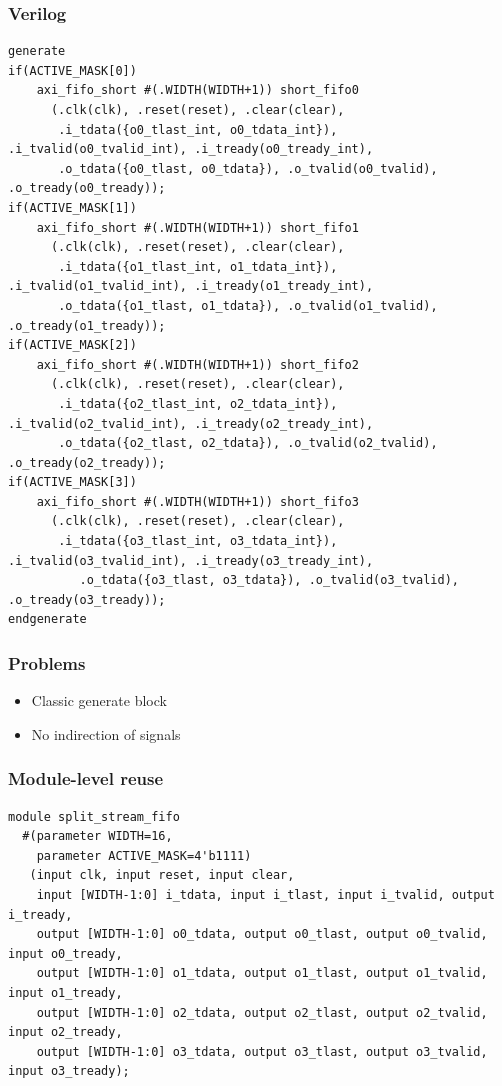 \documentclass{beamer}
\begin{document}
\begin{frame}[fragile]
\frametitle{Verilog}
\tiny
\begin{verbatim}
generate
if(ACTIVE_MASK[0])
	axi_fifo_short #(.WIDTH(WIDTH+1)) short_fifo0
	  (.clk(clk), .reset(reset), .clear(clear),
	   .i_tdata({o0_tlast_int, o0_tdata_int}), .i_tvalid(o0_tvalid_int), .i_tready(o0_tready_int),
	   .o_tdata({o0_tlast, o0_tdata}), .o_tvalid(o0_tvalid), .o_tready(o0_tready));
if(ACTIVE_MASK[1])
	axi_fifo_short #(.WIDTH(WIDTH+1)) short_fifo1
	  (.clk(clk), .reset(reset), .clear(clear),
	   .i_tdata({o1_tlast_int, o1_tdata_int}), .i_tvalid(o1_tvalid_int), .i_tready(o1_tready_int),
	   .o_tdata({o1_tlast, o1_tdata}), .o_tvalid(o1_tvalid), .o_tready(o1_tready));
if(ACTIVE_MASK[2])
	axi_fifo_short #(.WIDTH(WIDTH+1)) short_fifo2
	  (.clk(clk), .reset(reset), .clear(clear),
	   .i_tdata({o2_tlast_int, o2_tdata_int}), .i_tvalid(o2_tvalid_int), .i_tready(o2_tready_int),
	   .o_tdata({o2_tlast, o2_tdata}), .o_tvalid(o2_tvalid), .o_tready(o2_tready));
if(ACTIVE_MASK[3])
	axi_fifo_short #(.WIDTH(WIDTH+1)) short_fifo3
	  (.clk(clk), .reset(reset), .clear(clear),
	   .i_tdata({o3_tlast_int, o3_tdata_int}), .i_tvalid(o3_tvalid_int), .i_tready(o3_tready_int),
	      .o_tdata({o3_tlast, o3_tdata}), .o_tvalid(o3_tvalid), .o_tready(o3_tready));
endgenerate
\end{verbatim}
\end{frame}

\begin{frame}
\frametitle{Problems}
\begin{itemize}
\item Classic generate block
\item No indirection of signals
\end{itemize}
\end{frame}


\begin{frame}[fragile]
\frametitle{Module-level reuse}
\tiny
\begin{verbatim}
module split_stream_fifo
  #(parameter WIDTH=16,
    parameter ACTIVE_MASK=4'b1111)
   (input clk, input reset, input clear,
    input [WIDTH-1:0] i_tdata, input i_tlast, input i_tvalid, output i_tready,
    output [WIDTH-1:0] o0_tdata, output o0_tlast, output o0_tvalid, input o0_tready,
    output [WIDTH-1:0] o1_tdata, output o1_tlast, output o1_tvalid, input o1_tready,
    output [WIDTH-1:0] o2_tdata, output o2_tlast, output o2_tvalid, input o2_tready,
    output [WIDTH-1:0] o3_tdata, output o3_tlast, output o3_tvalid, input o3_tready);
\end{verbatim}
\end{frame}
\end{document}
